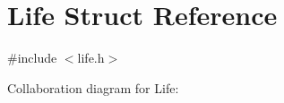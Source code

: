 \hypertarget{structLife}{}\section{Life Struct Reference}
\label{structLife}


{\ttfamily \#include $<$life.\+h$>$}



Collaboration diagram for Life\+:
